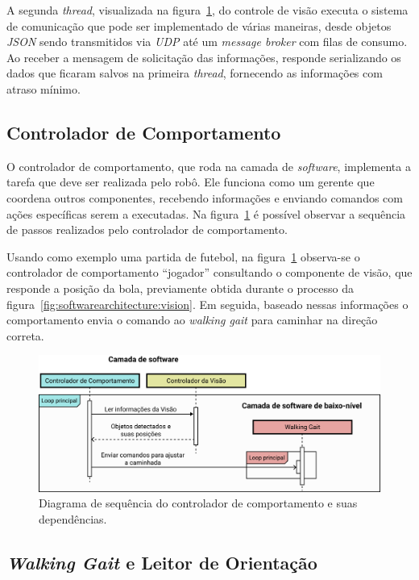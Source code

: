 A segunda \textit{thread}, visualizada na figura~\ref{fig:softwarearchitecture:software}, do controle de visão executa o sistema de comunicação que pode ser implementado de várias maneiras, desde objetos \textit{JSON} sendo transmitidos via \textit{UDP} até um \textit{message broker} com filas de consumo. Ao receber a mensagem de solicitação das informações, responde serializando os dados que ficaram salvos na primeira \textit{thread}, fornecendo as informações com atraso mínimo.

\subsection{Controlador de Comportamento}

O controlador de comportamento, que roda na camada de \textit{software}, implementa a tarefa que deve ser realizada pelo robô. Ele funciona como um gerente que coordena outros componentes, recebendo informações e enviando comandos com ações específicas serem a executadas. Na figura~\ref{fig:softwarearchitecture:software} é possível observar a sequência de passos realizados pelo controlador de comportamento.

Usando como exemplo uma partida de futebol, na figura~\ref{fig:softwarearchitecture:software} observa-se o controlador de comportamento ``jogador'' consultando o componente de visão, que responde a posição da bola, previamente obtida durante o processo da figura~\ref{fig:softwarearchitecture:vision}. Em seguida, baseado nessas informações o comportamento envia o comando ao \textit{walking gait} para caminhar na direção correta.

\begin{figure}[htb]
	\centering
	\includegraphics[scale=1]{imagens/svg/softwarearchitecture-software}
	\caption{Diagrama de sequência do controlador de comportamento e suas dependências.}
	\label{fig:softwarearchitecture:software}
\end{figure}

\subsection{\textit{Walking Gait} e Leitor de Orientação}

